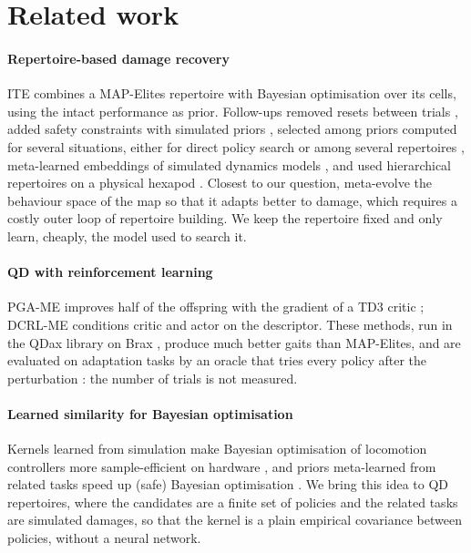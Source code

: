 \section{Related work}\label{sec:related}

\paragraph{Repertoire-based damage recovery} ITE \cite{cully2015robots} combines a MAP-Elites repertoire
\cite{mouret2015illuminating} with Bayesian optimisation over its cells, using the intact performance as prior.
Follow-ups removed resets between trials \cite{chatzilygeroudis2018reset}, added safety constraints with simulated
priors \cite{papaspyros2016safety}, selected among priors computed for several situations, either for direct policy
search \cite{pautrat2018bayesian} or among several repertoires \cite{kaushik2020adaptive}, meta-learned embeddings of
simulated dynamics models \cite{kaushik2020fast}, and used hierarchical repertoires on a physical hexapod
\cite{allard2022online}. Closest to our question, \citet{bossens2020learning} meta-evolve the behaviour space of the map
so that it adapts better to damage, which requires a costly outer loop of repertoire building. We keep the repertoire
fixed and only learn, cheaply, the model used to search it.

\paragraph{QD with reinforcement learning} PGA-ME \cite{nilsson2021policy} improves half of the offspring with the
gradient of a TD3 critic \cite{fujimoto2018addressing}; DCRL-ME \cite{faldor2024synergizing} conditions critic and
actor on the descriptor. These methods, run in the QDax library \cite{chalumeau2023qdax} on Brax
\cite{freeman2021brax}, produce much better gaits than MAP-Elites, and are evaluated on adaptation tasks by an oracle
that tries every policy after the perturbation \cite{chalumeau2023neuroevolution}: the number of trials is not measured.

\paragraph{Learned similarity for Bayesian optimisation} Kernels learned from simulation make Bayesian optimisation of
locomotion controllers more sample-efficient on hardware \cite{antonova2017deep,rai2019using}, and priors meta-learned
from related tasks speed up (safe) Bayesian optimisation \cite{swersky2013multi,feurer2018scalable,rothfuss2022meta}. We
bring this idea to QD repertoires, where the candidates are a finite set of policies and the related tasks are
simulated damages, so that the kernel is a plain empirical covariance between policies, without a neural network.

